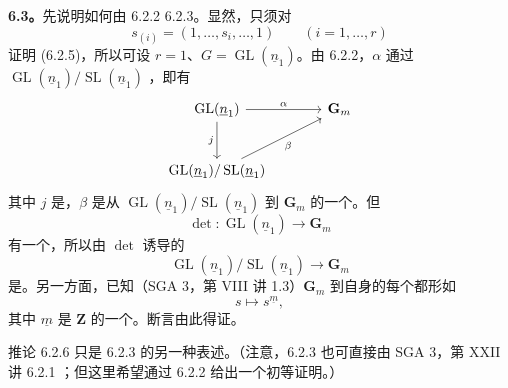 \textbf{6.3。}先说明如何由 6.2.2  6.2.3。显然，只须对
\[
 s_{(i)}=(1,\ldots,s_i,\ldots,1)\qquad(i=1,\ldots,r)
\]
证明 (6.2.5)，所以可设 $r=1$、$G=\operatorname{GL}(\underline n_1)$。由 6.2.2，$\alpha$ 通过 $\operatorname{GL}(\underline n_1)/\operatorname{SL}(\underline n_1)$ ，即有
\[
\begin{tikzcd}[column sep=large,row sep=large]
\operatorname{GL}(\underline n_1) \arrow[r,"\alpha"] \arrow[d,"j"'] & \mathbf G_m\\
\operatorname{GL}(\underline n_1)/\operatorname{SL}(\underline n_1) \arrow[ur,"\beta"'] &
\end{tikzcd}
\]
其中 $j$ 是，$\beta$ 是从 $\operatorname{GL}(\underline n_1)/\operatorname{SL}(\underline n_1)$ 到 $\mathbf G_m$ 的一个。但
\[
 \det:\operatorname{GL}(\underline n_1)\longrightarrow\mathbf G_m
\]
有一个，所以由 $\det$ 诱导的
\[
 \operatorname{GL}(\underline n_1)/\operatorname{SL}(\underline n_1)
 \longrightarrow\mathbf G_m
\]
是。另一方面，已知（SGA 3，第 VIII 讲 1.3）$\mathbf G_m$ 到自身的每个都形如
\[
 s\longmapsto s^{\underline m},
\]
其中 $\underline m$ 是 $\mathbf Z$ 的一个。断言由此得证。

推论 6.2.6 只是 6.2.3 的另一种表述。（注意，6.2.3 也可直接由 SGA 3，第 XXII 讲 6.2.1 ；但这里希望通过 6.2.2 给出一个初等证明。）

